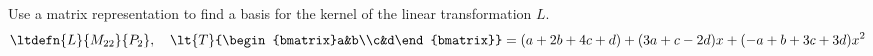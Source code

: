 Use a matrix representation to find a basis for the kernel of the linear transformation $L$.
%
\begin{equation*}
\ltdefn{L}{M_{22}}{P_2},\quad
\lt{T}{\begin{bmatrix}a&b\\c&d\end{bmatrix}}=
(a+2b+4c+d)+(3a+c-2d)x+(-a+b+3c+3d)x^2
\end{equation*}
